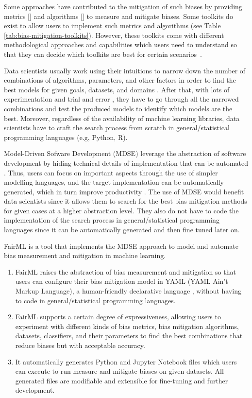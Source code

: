 \documentclass[sigconf,review]{acmart}
\begin{document}
Some approaches have contributed to the mitigation of such biases by providing metrics []  and algorithms [] to measure and mitigate biases. Some toolkits do exist to allow users to implement such metrics and algorithms (see Table \ref{tab:bias-mitigation-toolkits}).
However, these toolkits come with different methodological approaches and capabilities which users need to understand so that they can decide which toolkits are best for certain scenarios~\cite{lee2021landscape}.  

Data scientists usually work using their intuitions to narrow down the number of combinations of algorithms, parameters, and other factors in order to find the best models for given goals, datasets, and domains \cite{muller2016introduction}. After that, with lots of experimentation and trial and error \cite{byrne2017development}, they have to go through all the narrowed combinations and test the produced models to identify which models are the best. Moreover, regardless of the availability of machine learning libraries, data scientists have to craft the search process from scratch in general/statistical programming languages (e.g, Python, R).

Model-Driven Sofware Development (MDSE) leverage the abstraction of software development by hiding technical details of implementation that can be automated \cite{brambilla2017model}. Thus, users can focus on important aspects through the use of simpler modelling languages, and the target implementation can be automatically generated, which in turn improve productivity \cite{volter2013model}. The use of MDSE would benefit data scientists since it allows them to search for the best bias mitigation methods for given cases at a higher abstraction level. They also do not have to code the implementation of the search process in general/statistical programming languages since it can be automatically generated and then fine tuned later on. 

FairML is a tool that implements the MDSE approach to model and automate bias measurement and mitigation in machine learning. 
\begin{enumerate}
	\item FairML raises the abstraction of bias measurement and mitigation so that users can configure their bias mitigation model in YAML (YAML Ain’t Markup Language), a human-friendly declarative language \cite{evans2017yaml}, without having to code in general/statistical programming languages.
	\item FairML supports a certain degree of expressiveness, allowing users to experiment with different kinds of bias metrics, bias mitigation algorithms, datasets, classifiers, and their parameters to find the best combinations that reduce biases but with acceptable accuracy.
	\item It automatically generates Python and Jupyter Notebook files which users can execute to run measure and mitigate biases on given datasets. All generated files are modifiable and extensible for fine-tuning and further development.
\end{enumerate}
\end{document}
